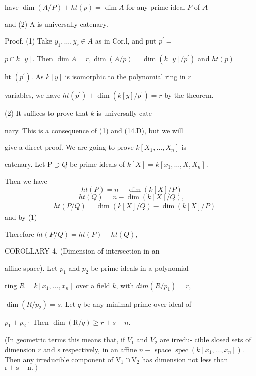 have $\operatorname{dim}(A / P)+h t(p)=\operatorname{dim} A$ for any prime ideal $P$ of $A$

and (2) A is universally catenary.

Proof. (1) Take $y_{1}, \ldots, y_{r} \in A$ as in Cor.l, and put $p^{\prime}=$

$p \cap k[y]$. Then $\operatorname{dim} A=r, \operatorname{dim}(A / p)=\operatorname{dim}\left(k[y] / p^{\prime}\right)$ and $h t(p)=$

ht $\left(p^{\prime}\right)$. As $k[y]$ is isomorphic to the polynomial ring in $r$

variables, we have $h t\left(p^{\prime}\right)+\operatorname{dim}\left(k[y] / p^{\prime}\right)=r$ by the theorem.

(2) It suffices to prove that $k$ is universally cate-

nary. This is a consequence of (1) and (14.D), but we will

give a direct proof. We are going to prove $k\left[X_{1}, \ldots, X_{n}\right]$ is

catenary. Let $\mathrm{P} \supset Q$ be prime ideals of $k[X]=k\left[x_{1}, \ldots, X, X_{n}\right]$.

Then we have
$$
h t(P)=n-\operatorname{dim}(k[X] / P)
$$
$$
h t(Q)=n-\operatorname{dim}(k[X] / Q),
$$
$$
\begin{aligned}
& h t(P / Q)=\operatorname{dim}(k[X] / Q)-\operatorname{dim}(k[X] / P)
\end{aligned}
$$
and by (1)

Therefore $h t(P / Q)=h t(P)-h t(Q)$,

COROLLARY 4. (Dimension of intersection in an

affine space). Let $p_{1}$ and $p_{2}$ be prime ideals in a polynomial

ring $R=k\left[x_{1}, \ldots, x_{n}\right]$ over a field $k$, with $d i m\left(R / p_{1}\right)=r$,

$\operatorname{dim}\left(R / p_{2}\right)=s$. Let $q$ be any minimal prime over-ideal of

$p_{1}+p_{2} \cdot$ Then $\operatorname{dim}(\mathrm{R} / q) \geqslant r+s-n .$

(In geometric terms this means that, if $V_{1}$ and $V_{2}$ are irredu- cible slosed sets of dimension $r$ and s respectively, in an affine $n-$ space $\operatorname{spec}\left(k\left[x_{1}, \ldots, x_{n}\right]\right)$. Then any irreducible component of $\mathrm{V}_{1} \cap \mathrm{V}_{2}$ has dimension not less than $\left.\mathrm{r}+\mathrm{s}-\mathrm{n} .\right)$


